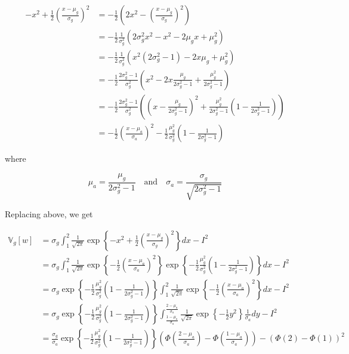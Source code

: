 \begin{align*}
-x^{2} +\frac{1}{2} \left(\frac{x - \mu_g}{\sigma_g}\right)^{2} &= -\frac{1}{2} \left( 2x^{2} -  \left(\frac{x - \mu_g}{\sigma_g}\right)^{2} \right) \\
&= -\frac{1}{2} \frac{1}{\sigma_g^{2}} \left( 2 \sigma_g^{2} x^{2}  - x^{2} - 2 \mu_g x + \mu_g^{2} \right) \\
&= -\frac{1}{2} \frac{1}{\sigma_g^{2}} \left( x^{2} (2\sigma_g^{2} - 1) - 2x \mu_g + \mu_g^{2} \right) \\
&= -\frac{1}{2} \frac{2\sigma_g^{2} - 1}{\sigma_g^{2}} \left( x^{2} - 2x \frac{\mu_g}{2\sigma_g^{2} - 1} + \frac{\mu_g^{2}}{2\sigma_g^{2} - 1} \right) \\
&= -\frac{1}{2} \frac{2\sigma_g^{2} - 1}{\sigma_g^{2}} \left( \left( x - \frac{\mu_g}{2\sigma_g^{2} - 1} \right)^{2}  + \frac{\mu_g^{2}}{2\sigma_g^{2} - 1}\left(1 - \frac{1}{2\sigma_g^{2} - 1} \right) \right) \\
&= -\frac{1}{2} \left( \frac{x - \mu_a}{\sigma_a} \right)^{2} - \frac{1}{2} \frac{\mu_g^{2}}{\sigma_g^{2}} \left(1 - \frac{1}{2\sigma_g^{2} - 1} \right)
\end{align*}

where

\[ \mu_a = \frac{\mu_g}{2\sigma_g^{2} - 1} 
\quad \text{and} \quad
\sigma_a = \frac{\sigma_g}{\sqrt{2 \sigma_g^{2} - 1}} \]

Replacing above, we get

\begin{align*}
\mathbb{V}_g[w] &= \sigma_g \int_{1}^{2} \frac{1}{\sqrt{2 \pi}} \exp \left\{ -x^{2} +\frac{1}{2} \left(\frac{x - \mu_g}{\sigma_g}\right)^{2} \right\} dx - I^{2} \\
&= \sigma_g \int_{1}^{2} \frac{1}{\sqrt{2 \pi}} \exp \left\{ -\frac{1}{2} \left( \frac{x - \mu_a}{\sigma_a} \right)^{2} \right\} \exp \left\{ - \frac{1}{2} \frac{\mu_g^{2}}{\sigma_g^{2}} \left(1 - \frac{1}{2\sigma_g^{2} - 1} \right) \right\} dx - I^{2} \\
&= \sigma_g \exp \left\{ - \frac{1}{2} \frac{\mu_g^{2}}{\sigma_g^{2}} \left(1 - \frac{1}{2\sigma_g^{2} - 1} \right) \right\} \int_{1}^{2} \frac{1}{\sqrt{2 \pi}} \exp \left\{ -\frac{1}{2} \left( \frac{x - \mu_a}{\sigma_a} \right)^{2} \right\} dx - I^{2} \\
&= \sigma_g \exp \left\{ - \frac{1}{2} \frac{\mu_g^{2}}{\sigma_g^{2}} \left(1 - \frac{1}{2\sigma_g^{2} - 1} \right) \right\} \int_{\frac{1 - \mu_a}{\sigma_a}}^{\frac{2 - \mu_a}{\sigma_a}} \frac{1}{\sqrt{2 \pi}} \exp \left\{ -\frac{1}{2} y^{2} \right\} \frac{1}{\sigma_a} dy - I^{2} \\
&= \frac{\sigma_g}{\sigma_a} \exp \left\{ - \frac{1}{2} \frac{\mu_g^{2}}{\sigma_g^{2}} \left(1 - \frac{1}{2\sigma_g^{2} - 1} \right) \right\}  \left( \Phi\left(\frac{2 - \mu_a}{\sigma_a}\right) - \Phi\left(\frac{1 - \mu_a}{\sigma_a}\right) \right) - \left( \Phi(2) - \Phi(1) \right)^{2}
\end{align*}

